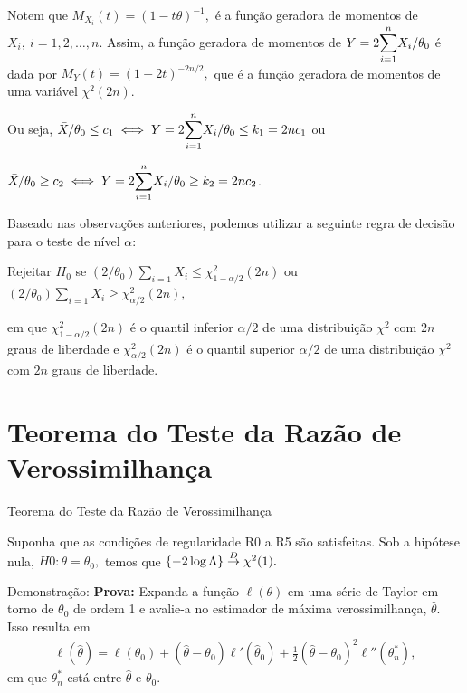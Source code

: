 \documentclass[12pt]{beamer}
\begin{document}
\begin{frame}{}
\begin{block}{}
\justifying
Notem que $M_{X_{i}}(t)=(1-t\theta)^{-1},$ é a função geradora de momentos de $X_{i},~i=1,2,\ldots,n.$ Assim, a função geradora de momentos de $Y=2{\displaystyle \sum_{i=1}^{n}} X_{i}/\theta_0$ é dada por $M_{Y}(t)=(1-2t)^{-2n/2},$ que é a função geradora de momentos de uma variável $\chi^{2}(2n).$
\end{block}
\pause
\begin{block}{}
\justifying
Ou seja, $\Bar{X}/\theta_0 \leq c_1\iff Y=2{\displaystyle \sum_{i=1}^{n}} X_{i}/\theta_0\leq k_{1}=2nc_{1}$ ou 
\end{block}
\pause
\begin{block}{}
\justifying
$\Bar{X}/\theta_0 \geq c_2\iff Y=2{\displaystyle \sum_{i=1}^{n}} X_{i}/\theta_0\geq k_{2}=2nc_{2}$.
\end{block}
\end{frame}

\begin{frame}{}
\begin{block}{}
\justifying
Baseado nas observações anteriores, podemos utilizar a seguinte regra de decisão para o teste de nível $\alpha$:
\end{block}
\pause
\begin{block}{}
\justifying
Rejeitar $H_0$ se $(2/\theta_0) \sum_{i=1} X_i \leq \chi^2_{1-\alpha/2}(2n)$ ou $(2/\theta_0) \sum_{i=1} X_i \geq \chi^2_{\alpha/2}(2n),$
\end{block}
\begin{block}{}
\justifying
em que $\chi^2_{1-\alpha/2}(2n)$ é o quantil inferior $\alpha/2$ de uma distribuição $\chi^2$ com $2n$ graus de liberdade e $\chi^2_{\alpha/2}(2n)$ é o quantil superior $\alpha/2$ de uma distribuição $\chi^2$ com $2n$ graus de liberdade.
\end{block}
\end{frame}


\section{Teorema do Teste da Razão de Verossimilhança}
\begin{frame}{Teorema do Teste da Razão de Verossimilhança}
\begin{Teorema}
\justifying
Suponha que as condições de regularidade R0 a R5 são satisfeitas. Sob a hipótese nula, $H0: \theta = \theta_0,$ temos que $\{-2 \log \Lambda\} \overset{D}{\rightarrow} \chi^2(1).$
\end{Teorema}
\pause
\begin{block}{Demonstração:}
\justifying
\textbf{Prova:} Expanda a função $\ell(\theta)$ em uma série de Taylor em torno de $\theta_0$ de ordem 1 e avalie-a no estimador de máxima verossimilhança, $\hat{\theta}$. Isso resulta em
\begin{align}\label{6.3.8}
    \ell(\hat{\theta}) = \ell(\theta_{0}) + (\hat{\theta} - \theta_0)\ell'(\hat{\theta}_{0}) + \frac{1}{2}(\hat{\theta} - \theta_0)^2 \ell''(\theta^{*}_{n}),
\end{align}
em que $\theta^*_n$ está entre $\hat{\theta}$ e $\theta_0.$
\end{block}
\end{frame}
\end{document}
